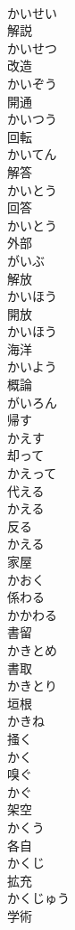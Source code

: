 \documentclass[8pt]{extreport}
\begin{document}
\begin{CJK}{UTF8}{min}
\\	かいせい	
\\	解説 
\\	かいせつ	
\\	改造 
\\	かいぞう	
\\	開通 
\\	かいつう	
\\	回転 
\\	かいてん	
\\	解答 
\\	かいとう	
\\	回答 
\\	かいとう	
\\	外部 
\\	がいぶ	
\\	解放 
\\	かいほう	
\\	開放 
\\	かいほう	
\\	海洋 
\\	かいよう	
\\	概論 
\\	がいろん	
\\	帰す 
\\	かえす	
\\	却って 
\\	かえって	
\\	代える 
\\	かえる	
\\	反る 
\\	かえる	
\\	家屋 
\\	かおく	
\\	係わる 
\\	かかわる	
\\	書留 
\\	かきとめ	
\\	書取 
\\	かきとり	
\\	垣根 
\\	かきね	
\\	掻く 
\\	かく	
\\	嗅ぐ 
\\	かぐ	
\\	架空 
\\	かくう	
\\	各自 
\\	かくじ	
\\	拡充 
\\	かくじゅう	
\\	学術 

\end{CJK}
\end{document}
